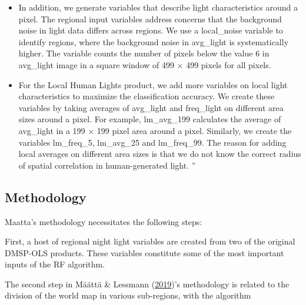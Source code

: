\documentclass[11pt,preprint, authoryear]{elsarticle}
\numberwithin{equation}{section}
\numberwithin{figure}{section}
\numberwithin{table}{section}
\begin{document}
\begin{itemize}
\item
  In addition, we generate variables that describe light characteristics
  around a pixel. The regional input variables address concerns that the
  background noise in light data differs across regions. We use a
  local\_noise variable to identify regions, where the background noise
  in avg\_light is systematically higher. The variable counts the number
  of pixels below the value 6 in avg\_light image in a square window of
  499 × 499 pixels for all pixels.
\item
  For the Local Human Lights product, we add more variables on local
  light characteristics to maximize the classification accuracy. We
  create these variables by taking averages of avg\_light and
  freq\_light on different area sizes around a pixel. For example,
  lm\_avg\_199 calculates the average of avg\_light in a 199 × 199 pixel
  area around a pixel. Similarly, we create the variables lm\_freq\_5,
  lm\_avg\_25 and lm\_freq\_99. The reason for adding local averages on
  different area sizes is that we do not know the correct radius of
  spatial correlation in human-generated light. ''
\end{itemize}

\hypertarget{methodology}{%
\subsection{Methodology}\label{methodology}}

Maatta's methodology necessitates the following steps:

First, a host of regional night light variables are created from two of
the original DMSP-OLS products. These variables constitute some of the
most important inputs of the RF algorithm.

The second step in Määttä \& Lessmann
(\protect\hyperlink{ref-maatta}{2019})'s methodology is related to the
division of the world map in various sub-regions, with the algorithm
\end{document}
